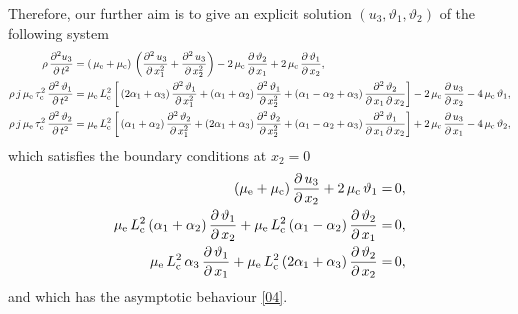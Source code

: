 \documentclass[10pt]{article}
\begin{document}
 
 Therefore, our further aim  is to give an explicit solution  $(u_3, \vartheta_1,\vartheta_2   )$ of the following  system
 \begin{align}\label{x6}
 \rho\, \frac{\partial^2{u}_{3}}{ \partial \,t^2}&=(\,\mu_{\rm e}+\mu_{\rm c}) \,\left(\frac{\partial^2 \,u_{3}}{\partial \,x_1^2}+\frac{\partial^2 \,u_{3}}{\partial \,x_2^2}\right)-2\,\mu_{\rm c} \, \frac{\partial \,\vartheta _{2}}{\partial \,x_1}+2\,\mu_{\rm c} \, \frac{\partial \,\vartheta _{1}}{\partial \,x_2},\\
\rho \,j\,\mu_{\rm e}\,\tau_{\rm c}^2\,\frac{\partial^2 \,{{\vartheta }_{1}}}{\partial \,t^2}&={\mu_{\rm e}\,L_{\rm c}^2}\left[\,(2\alpha_1+\alpha_3) \,\frac{\partial^2 \,\vartheta _{1}}{\partial \,x_1^2}+(\alpha_1+\alpha_2) \,\frac{\partial^2 \,\vartheta _{1}}{\partial \,x_2^2}+(\alpha_1-\alpha_2+\alpha_3) \,\frac{\partial^2 \,\vartheta _{2}}{\partial \,x_1\,\partial \,x_2}\right]-2\,\mu_{\rm c} \,  \frac{\partial \,u_{3}}{\partial \,x_2}-4\,\mu_{\rm c} \, \vartheta _1,\notag\\
\rho \,j\,\mu_{\rm e}\,\tau_{\rm c}^2\,\frac{\partial^2 \,{{\vartheta }_{2}}}{\partial \,t^2}&={\mu_{\rm e}\,L_{\rm c}^2}\left[\,(\alpha_1+\alpha_2) \,\frac{\partial^2 \,\vartheta _{2}}{\partial \,x_1^2}+(2\alpha_1+\alpha_3) \,\frac{\partial^2 \,\vartheta _{2}}{\partial \,x_2^2}+(\alpha_1-\alpha_2+\alpha_3) \,\frac{\partial^2 \,\vartheta _{1}}{\partial \,x_1\,\partial \,x_2}\right]+2\,\mu_{\rm c} \,  \frac{\partial \,u_{3}}{\partial \,x_1}-4\,\mu_{\rm c} \, \vartheta _2,\notag
 \end{align}
 which satisfies the boundary conditions at $x_2=0$
 \begin{align}\label{x17}
  (\mu_{\rm e}+\mu_{\rm c})\,\frac{\partial\, u_{3}}{\partial\,x_2}+2\,\mu_{\rm c}\,\vartheta _1=&\,0,\notag\\
 {\mu_{\rm e}\,L_{\rm c}^2}\,({\alpha_1+\alpha_2})\,\frac{\partial \,\vartheta _{1}}{\partial \,x_2}+{\mu_{\rm e}\,L_{\rm c}^2}\,({\alpha_1-\alpha_2})\,\frac{\partial \,\vartheta _{2}}{\partial \,x_1}=&\,0,\\
 {\mu_{\rm e}\,L_{\rm c}^2}\,\alpha_3\,\frac{\partial \,\vartheta _{1}}{\partial \,x_1}+{\mu_{\rm e}\,L_{\rm c}^2}\,({2\alpha_1+\alpha_3})\,\frac{\partial \,\vartheta _{2}}{\partial \,x_2}=&\,0,\notag
 \end{align}
 and which has the asymptotic behaviour \eqref{04}.
 
 
\end{document}
